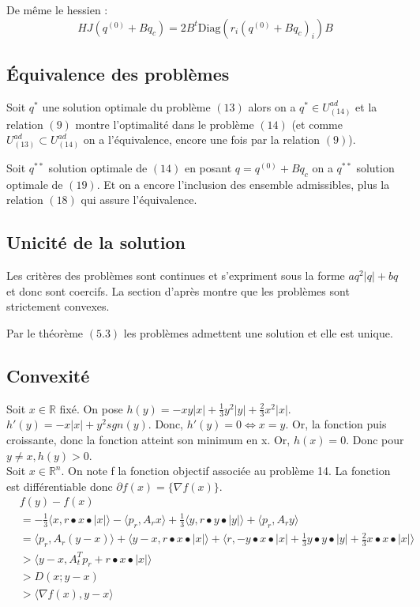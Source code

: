 \documentclass[12pt, letterpaper]{article}
\newcommand{\R}{\mathbb{R}^n}
\begin{document}
De même le hessien :
$$ H J (q^{(0)} + B q_c) = 2 B^t \text{Diag}(r_i (q^{(0)} + B q_c)_i) B $$

\subsection*{Équivalence des problèmes}

Soit $q^*$ une solution optimale du problème $(13)$ alors on a $q^* \in U^{ad}_{(14)}$ et la relation $(9)$ montre l'optimalité dans le problème $(14)$ (et comme $U_{(13)}^{ad} \subset U_{(14)}^{ad}$ on a l'équivalence, encore une fois par la relation $(9)$).

\noindent Soit $q^{**}$ solution optimale de $(14)$ en posant $q = q^{(0)} + B q_c$ on a $q^{**}$ solution optimale de $(19)$. Et on a encore l’inclusion des ensemble admissibles, plus la relation $(18)$ qui assure l'équivalence.

\subsection*{Unicité de la solution}

Les critères des problèmes sont continues et s'expriment sous la forme $a q^2|q| + b q$ et donc sont coercifs. La section d'après montre que les problèmes sont strictement convexes.

Par le théorème $(5.3)$ les problèmes admettent une solution et elle est unique.

\subsection*{Convexité}
Soit $x\in \mathbb{R}$ fixé. On pose $h(y) = -x y |x| + \frac{1}{3} y^2 |y| + \frac{2}{3} x^2 |x|$.
 $h'(y) = -x |x| + y^2 sgn(y)$. Donc, $h'(y) = 0 \Leftrightarrow x = y$. Or, la fonction puis croissante, donc la fonction atteint son minimum en x. Or, $h(x) = 0$. Donc pour $y \neq x, h(y) > 0
$. \\

Soit $x\in\R$. On note f la fonction objectif associée au problème 14. La fonction est différentiable donc $\partial f(x) = \{\nabla f(x)\}$. 
\begin{align*}
&f(y) - f(x) \\
&= -\frac{1}{3} \langle x,r \bullet x \bullet |x|\rangle  - \langle p_r,A_rx\rangle  + \frac{1}{3}\langle y,r \bullet y \bullet |y|\rangle  + \langle p_r,A_ry\rangle   \\
&= \langle p_r,A_r(y - x)\rangle  + \langle y-x, r \bullet x \bullet |x|\rangle  + \langle r, -y \bullet x \bullet |x| + \frac{1}{3}y \bullet y \bullet |y| + \frac{2}{3}x \bullet x \bullet |x|\rangle \\
&>  \langle y-x,A_t^Tp_r + r \bullet x \bullet |x|\rangle  \tag{les termes que l'on a enlevé étaient positifs par le lemme ci-dessus} \\
&>  D(x;y-x)\\
&>  \langle \nabla f(x),y-x\rangle 
\end{align*}
\end{document}
